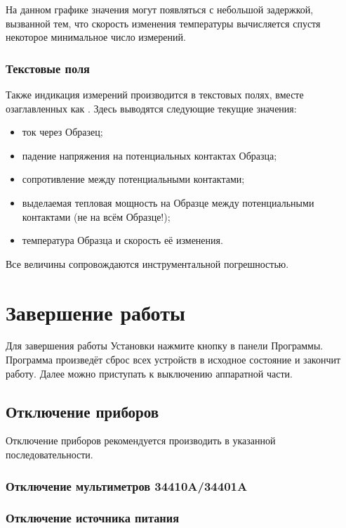 \documentclass[12pt, a4paper, twocolumn]{report}
\begin{document}
На данном графике значения могут появляться с небольшой задержкой, вызванной тем, что скорость изменения температуры вычисляется спустя некоторое минимальное число измерений.

\subsection{Текстовые поля}

Также индикация измерений производится в текстовых полях, вместе озаглавленных как . Здесь выводятся следующие текущие значения:

\begin{itemize}
\item ток через Образец;
\item падение напряжения на потенциальных контактах Образца;
\item сопротивление между потенциальными контактами;
\item выделаемая тепловая мощность на Образце между потенциальными контактами (не на всём Образце!);
\item температура Образца и скорость её изменения.
\end{itemize}

Все величины сопровождаются инструментальной погрешностью.

\chapter{Завершение работы}

Для завершения работы Установки нажмите кнопку  в панели Программы. Программа произведёт сброс всех устройств в исходное состояние и закончит работу. Далее можно приступать к выключению аппаратной части.

\section{Отключение приборов}

Отключение приборов рекомендуется производить в указанной последовательности.

\subsection{Отключение мультиметров 34410A/34401A}



\subsection{Отключение источника питания}
\end{document}
